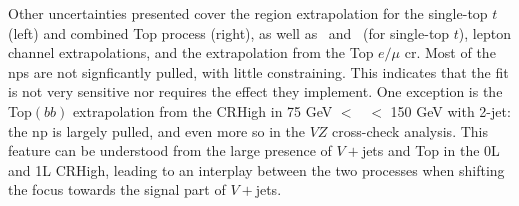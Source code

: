 Other uncertainties presented cover the region extrapolation for the single-top $t$ (left) and combined Top process (right), as well as \nj\ and \ptv\ (for single-top $t$), lepton channel extrapolations, and the extrapolation from the Top $e/\mu$ \gls{cr}. Most of the \gls{np}s are not signficantly pulled, with little constraining. This indicates that the fit is not very sensitive nor requires the effect they implement. One exception is the Top$(bb)$ extrapolation from the CRHigh in 75 GeV $<$ \ptv\ $<$ 150 GeV with 2-jet: the \gls{np} is largely pulled, and even more so in the $VZ$ cross-check analysis. This feature can be understood from the large presence of $V+$jets and Top in the 0L and 1L CRHigh, leading to an interplay between the two processes when shifting the focus towards the signal part of $V+$jets. 